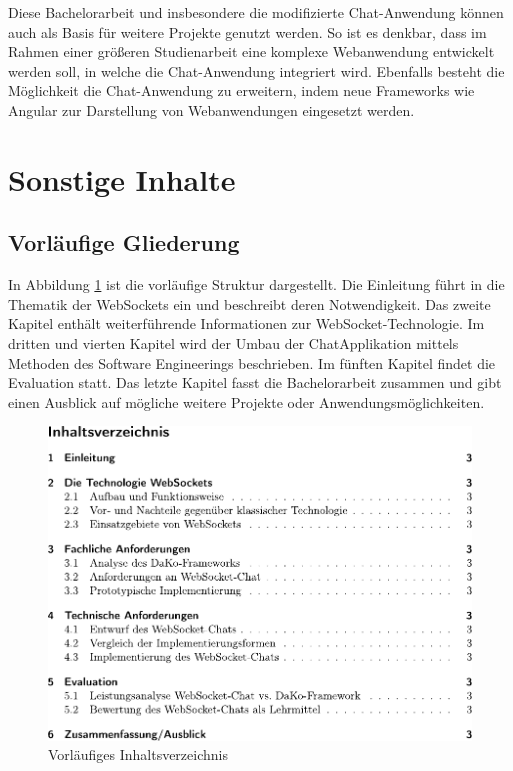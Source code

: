 \documentclass[11pt,a4paper,titlepage]{scrartcl}
\numberwithin{equation}{section}
\begin{document}
\noindent Diese Bachelorarbeit und insbesondere die modifizierte Chat-Anwendung können auch als Basis für weitere Projekte genutzt werden. So ist es denkbar, dass im Rahmen einer größeren Studienarbeit eine komplexe Webanwendung entwickelt werden soll, in welche die Chat-Anwendung integriert wird. Ebenfalls besteht die Möglichkeit die Chat-Anwendung zu erweitern, indem neue Frameworks wie Angular zur Darstellung von Webanwendungen eingesetzt werden.

\section{Sonstige Inhalte}
\subsection{Vorläufige Gliederung}
In Abbildung \ref{fig:toc} ist die vorläufige Struktur dargestellt. Die Einleitung führt in die Thematik der WebSockets ein und beschreibt deren Notwendigkeit. Das zweite Kapitel enthält weiterführende Informationen zur WebSocket-Technologie. Im dritten und vierten Kapitel wird der Umbau der ChatApplikation mittels Methoden des Software Engineerings beschrieben. Im fünften Kapitel findet die Evaluation statt. Das letzte Kapitel fasst die Bachelorarbeit zusammen und gibt einen Ausblick auf mögliche weitere Projekte oder Anwendungsmöglichkeiten.
\begin{figure}[ht] \label{fig:toc}
	\begin{center}
	\includegraphics[scale=1.0]{img/toc.pdf}
		 \caption{Vorläufiges Inhaltsverzeichnis}
	\end{center}
\end{figure}
\end{document}
